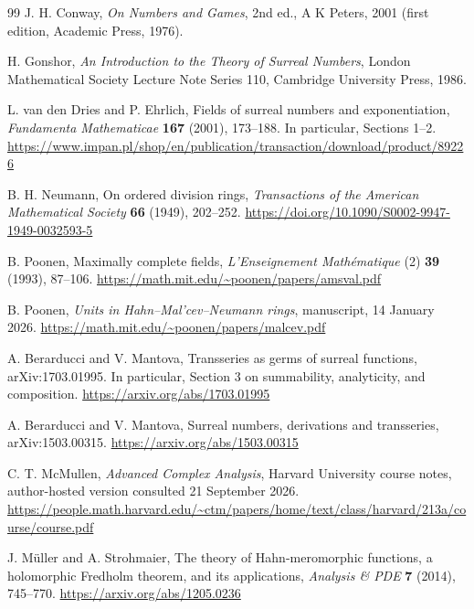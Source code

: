 \documentclass[11pt,a4paper]{article}
\theoremstyle{definition}
\theoremstyle{remark}
\begin{document}
\clearpage
{}
{}
\begin{thebibliography}{99}
J. H. Conway, \emph{On Numbers and Games}, 2nd ed., A K Peters, 2001
(first edition, Academic Press, 1976).

H. Gonshor, \emph{An Introduction to the Theory of Surreal Numbers},
London Mathematical Society Lecture Note Series 110, Cambridge
University Press, 1986.

L. van den Dries and P. Ehrlich, Fields of surreal numbers and
exponentiation, \emph{Fundamenta Mathematicae} \textbf{167} (2001),
173--188. In particular, Sections 1--2.
\url{https://www.impan.pl/shop/en/publication/transaction/download/product/89226}

B. H. Neumann, On ordered division rings,
\emph{Transactions of the American Mathematical Society}
\textbf{66} (1949), 202--252.
\url{https://doi.org/10.1090/S0002-9947-1949-0032593-5}

B. Poonen, Maximally complete fields,
\emph{L'Enseignement Math\'ematique} (2) \textbf{39} (1993), 87--106.
\url{https://math.mit.edu/~poonen/papers/amsval.pdf}

B. Poonen, \emph{Units in Hahn--Mal'cev--Neumann rings}, manuscript,
14 January 2026.
\url{https://math.mit.edu/~poonen/papers/malcev.pdf}

A. Berarducci and V. Mantova, Transseries as germs of surreal
functions, arXiv:1703.01995. In particular, Section 3 on summability,
analyticity, and composition.
\url{https://arxiv.org/abs/1703.01995}

A. Berarducci and V. Mantova, Surreal numbers, derivations and
transseries, arXiv:1503.00315.
\url{https://arxiv.org/abs/1503.00315}

C. T. McMullen, \emph{Advanced Complex Analysis}, Harvard University
course notes, author-hosted version consulted 21 September 2026.
\url{https://people.math.harvard.edu/~ctm/papers/home/text/class/harvard/213a/course/course.pdf}

J. M\"uller and A. Strohmaier, The theory of Hahn-meromorphic
functions, a holomorphic Fredholm theorem, and its applications,
\emph{Analysis \& PDE} \textbf{7} (2014), 745--770.
\url{https://arxiv.org/abs/1205.0236}
\end{thebibliography}
\end{document}
